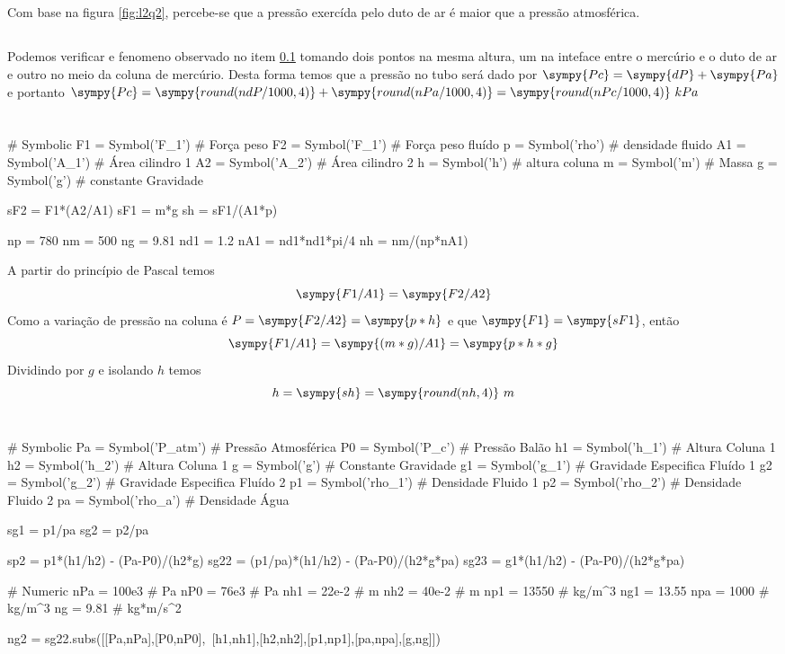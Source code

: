 \documentclass[a4paper,twocolumn,11pt]{article}
\newcommand{\npy}[1]{\sympy{round(n#1,4)}}
\newcommand{\epy}[1]{\sympy{#1} = \sympy{s#1}}
\begin{document}
\subsection{}\label{q2a} Com base na figura \ref{fig:l2q2}, percebe-se que a pressão exercída pelo duto de ar é maior que a pressão atmosférica.
\subsection{} Podemos verificar e fenomeno observado no item \ref{q2a} tomando dois pontos na mesma altura, um na inteface entre o mercúrio e o duto de ar e outro no meio da coluna de mercúrio. Desta forma temos que a pressão no tubo será dado por $\sympy{Pc} = \sympy{dP} + \sympy{Pa}$ e portanto $\sympy{Pc} = \npy{dP/1000} + \npy{Pa/1000} = \npy{Pc/1000}\ kPa$

\section{} %
\begin{sympycode}
# Symbolic
F1 = Symbol('F_1') # Força peso
F2 = Symbol('F_1') # Força peso fluído
p = Symbol('rho') # densidade fluido
A1 = Symbol('A_1') # Área cilindro 1
A2 = Symbol('A_2') # Área cilindro 2
h = Symbol('h') # altura coluna
m = Symbol('m') # Massa
g = Symbol('g') # constante Gravidade

sF2 = F1*(A2/A1)
sF1 = m*g
sh = sF1/(A1*p)

np = 780
nm = 500
ng = 9.81
nd1 = 1.2
nA1 = nd1*nd1*pi/4
nh = nm/(np*nA1)
\end{sympycode}
A partir do princípio de Pascal temos $$\sympy{F1/A1} = \sympy{F2/A2}$$
Como a variação de pressão na coluna é $P = \sympy{F2/A2} = \sympy{p*h}$ e que $\epy{F1}$, então
$$\sympy{F1/A1} = \sympy{(m*g)/A1} = \sympy{p*h*g}$$
Dividindo por $g$ e isolando $h$ temos
$$
h = \sympy{sh} = \npy{h}\ m
$$

\section{} %
\begin{sympycode}
# Symbolic
Pa = Symbol('P_atm') # Pressão Atmosférica
P0 = Symbol('P_c') # Pressão Balão
h1 = Symbol('h_1') # Altura Coluna 1
h2 = Symbol('h_2') # Altura Coluna 1
g = Symbol('g') # Constante Gravidade
g1 = Symbol('g_1') # Gravidade Especifica Fluído 1
g2 = Symbol('g_2') # Gravidade Especifica Fluído 2
p1 = Symbol('rho_1') # Densidade Fluido 1
p2 = Symbol('rho_2') # Densidade Fluido 2
pa = Symbol('rho_a') # Densidade Água

sg1 = p1/pa
sg2 = p2/pa

sp2 = p1*(h1/h2) - (Pa-P0)/(h2*g)
sg22 = (p1/pa)*(h1/h2) - (Pa-P0)/(h2*g*pa)
sg23 = g1*(h1/h2) - (Pa-P0)/(h2*g*pa)

# Numeric
nPa = 100e3 # Pa
nP0 = 76e3 # Pa
nh1 = 22e-2 # m
nh2 = 40e-2 # m
np1 = 13550 # kg/m^3
ng1 = 13.55
npa = 1000 # kg/m^3
ng = 9.81 # kg*m/s^2

ng2 = sg22.subs([[Pa,nPa],[P0,nP0],\
    [h1,nh1],[h2,nh2],[p1,np1],[pa,npa],[g,ng]])

\end{sympycode}
\end{document}
